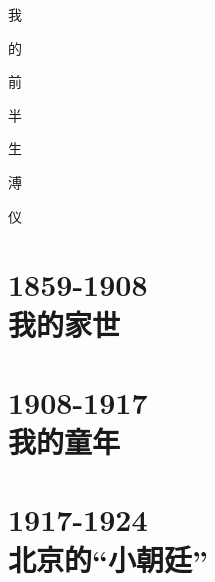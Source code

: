 \documentclass[twoside,openright,headings=optiontohead]{scrbook}
\begin{document}
\begin{figure}[ht]
\begin{center}

\end{center}
\end{figure}
\newpage
\begin{flushright}
{\Huge 我}

{\Huge 的}

{\Huge 前}

{\Huge 半}

{\Huge 生}

\vspace{1cm}

{\LARGE 溥}

{\LARGE 仪}
\end{flushright}
\newpage
{\color{TEXTColor}
\tableofcontents
\thispagestyle{empty}
\newpage
\part{1859-1908\\\hspace{1cm}我的家世}





\part{1908-1917\\\hspace{1cm}我的童年}






\part{1917-1924\\\hspace{1cm}北京的“小朝廷”}













}
\end{document}

